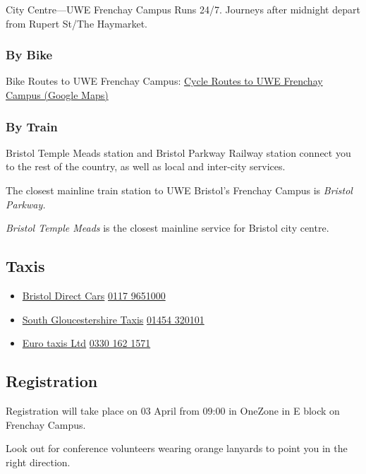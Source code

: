 \documentclass[12pt,a4paper]{article}
\begin{document}
City Centre---UWE Frenchay Campus Runs 24/7. Journeys after midnight depart from Rupert St/The Haymarket.

\subsubsection{By Bike}

Bike Routes to UWE Frenchay Campus: \href{https://www.google.com/maps/d/viewer?ll=51.48023677842282\%2C-2.556724999999993\&spn=0.104235\%2C0.2005\&msa=0\&mid=1YbZQn0a_k65SV-zbUKX1x9TIDDM\&z=12}{Cycle Routes to UWE Frenchay Campus (Google Maps)}

\subsubsection{By Train}

Bristol Temple Meads station and Bristol Parkway Railway station connect you to the rest of the country, as well as local and inter-city services.

The closest mainline train station to UWE Bristol's Frenchay Campus is \emph{Bristol Parkway.}

\emph{Bristol Temple Meads} is the closest mainline service for Bristol city centre.

\subsection{Taxis}

\begin{itemize}
\item \href{http://www.bristoldirectcars.co.uk/}{Bristol Direct Cars} \href{tel:01179651000}{0117 9651000}
\item \href{http://www.southgloscabs.co.uk/}{South Gloucestershire Taxis} \href{tel:01454320101}{01454 320101}
\item \href{https://www.eurotaxis.com/taxis/}{Euro taxis Ltd} \href{tel:03301621571}{0330 162 1571}
\end{itemize}

\subsection{Registration}

Registration will take place on 03 April from 09:00 in OneZone in E block on Frenchay Campus.

Look out for conference volunteers wearing orange lanyards to point you in the right direction.
\end{document}
